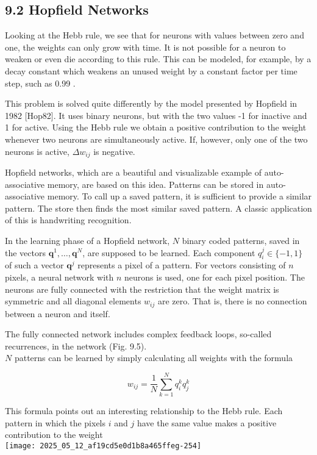 \documentclass[10pt]{article}
\begin{document}
\subsection*{9.2 Hopfield Networks}
Looking at the Hebb rule, we see that for neurons with values between zero and one, the weights can only grow with time. It is not possible for a neuron to weaken or even die according to this rule. This can be modeled, for example, by a decay constant which weakens an unused weight by a constant factor per time step, such as 0.99 .

This problem is solved quite differently by the model presented by Hopfield in 1982 [Hop82]. It uses binary neurons, but with the two values -1 for inactive and 1 for active. Using the Hebb rule we obtain a positive contribution to the weight whenever two neurons are simultaneously active. If, however, only one of the two neurons is active, $\Delta w_{i j}$ is negative.

Hopfield networks, which are a beautiful and visualizable example of auto-associative memory, are based on this idea. Patterns can be stored in auto-associative memory. To call up a saved pattern, it is sufficient to provide a similar pattern. The store then finds the most similar saved pattern. A classic application of this is handwriting recognition.

In the learning phase of a Hopfield network, $N$ binary coded patterns, saved in the vectors $\boldsymbol{q}^{1}, \ldots, \boldsymbol{q}^{N}$, are supposed to be learned. Each component $q_{i}^{j} \in\{-1,1\}$ of such a vector $\boldsymbol{q}^{j}$ represents a pixel of a pattern. For vectors consisting of $n$ pixels, a neural network with $n$ neurons is used, one for each pixel position. The neurons are fully connected with the restriction that the weight matrix is symmetric and all diagonal elements $w_{i j}$ are zero. That is, there is no connection between a neuron and itself.

The fully connected network includes complex feedback loops, so-called recurrences, in the network (Fig. 9.5).\\
$N$ patterns can be learned by simply calculating all weights with the formula


\begin{equation*}
w_{i j}=\frac{1}{N} \sum_{k=1}^{N} q_{i}^{k} q_{j}^{k} \tag{9.1}
\end{equation*}


This formula points out an interesting relationship to the Hebb rule. Each pattern in which the pixels $i$ and $j$ have the same value makes a positive contribution to the weight\\
\texttt{[image: 2025\_05\_12\_af19cd5e0d1b8a465ffeg-254]}
\end{document}
